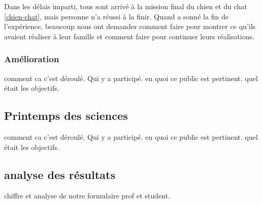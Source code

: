 Dans les délais imparti, tous sont arrivé à la mission final du chien et du chat \ref{chien-chat}, mais personne n'a réussi à la finir. Quand a sonné la fin de l'expérience, beaucoup nous ont demander comment faire pour montrer ce qu'ils avaient réaliser à leur famille et comment faire pour continuer leurs réalisations.

\subsubsection{Amélioration}

comment ca c'est déroulé. Qui y a participé. en quoi ce public est pertinent. quel était les objectifs.

\subsection{Printemps des sciences}
comment ca c'est déroulé. Qui y a participé. en quoi ce public est pertinent. quel était les objectifs.

\subsection{analyse des résultats}
chiffre et analyse de notre formulaire prof et student.